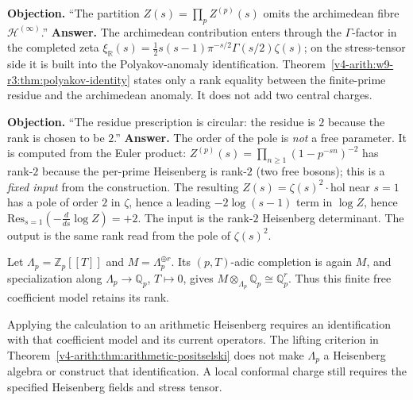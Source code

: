 \begin{remark}
\label{v4-arith:w9-r3:obstruction-5}
\textbf{Objection.} ``The partition \(Z(s)=\prod_{p}Z^{(p)}(s)\) omits
the archimedean fibre \(\mathcal{H}^{(\infty)}\).''
\textbf{Answer.} The archimedean contribution enters through the
\(\Gamma\)-factor in the completed zeta
\(\xi_{\mathbb{R}}(s)=\tfrac{1}{2}s(s-1)\pi^{-s/2}\Gamma(s/2)\zeta(s)\);
on the stress-tensor side it is built into the Polyakov-anomaly
identification. Theorem~\ref{v4-arith:w9-r3:thm:polyakov-identity}
states only a rank equality between the finite-prime residue and the
archimedean anomaly. It does not add two central charges.
\end{remark}

\begin{remark}[the order of the pole of \(\log Z\) at \(s=1\) is not a free parameter]
\label{v4-arith:w9-r3:obstruction-6}
\textbf{Objection.} ``The residue prescription is circular: the
residue is \(2\) because the rank is chosen to be \(2\).''
\textbf{Answer.} The order of the pole is \emph{not} a free parameter. It is
computed from the Euler product: \(Z^{(p)}(s)=\prod_{n\geq 1}(1-p^{-sn})^{-2}\)
has rank-\(2\) because the per-prime Heisenberg is rank-\(2\)
(two free bosons); this is a \emph{fixed input} from the
construction. The resulting \(Z(s)=\zeta(s)^{2}\cdot\mathrm{hol}\)
near \(s=1\) has a pole of order \(2\) in \(\zeta\), hence a leading
\(-2\log(s-1)\) term in \(\log Z\), hence
\(\mathrm{Res}_{s=1}(-\frac{d}{ds}\log Z)=+2\). The input is the
rank-\(2\) Heisenberg determinant. The output is the same rank read
from the pole of \(\zeta(s)^{2}\).
\end{remark}

\begin{remark}
\label{v4-arith:w9-r3:obstruction-7}
Let \(\Lambda_p=\mathbb Z_p[[T]]\) and
\(M=\Lambda_p^{\oplus r}\). Its \((p,T)\)-adic completion
is again \(M\), and specialization along
\(\Lambda_p\to\mathbb Q_p\), \(T\mapsto0\), gives
\(M\otimes_{\Lambda_p}\mathbb Q_p\cong\mathbb Q_p^r\).
Thus this finite free coefficient model retains its rank.

Applying the calculation to an arithmetic Heisenberg requires
an identification with that coefficient model and its current
operators. The lifting criterion in
Theorem~\ref{v4-arith:thm:arithmetic-positselski}
does not make \(\Lambda_p\) a Heisenberg algebra or construct
that identification. A local conformal charge still requires
the specified Heisenberg fields and stress tensor.
\end{remark}

